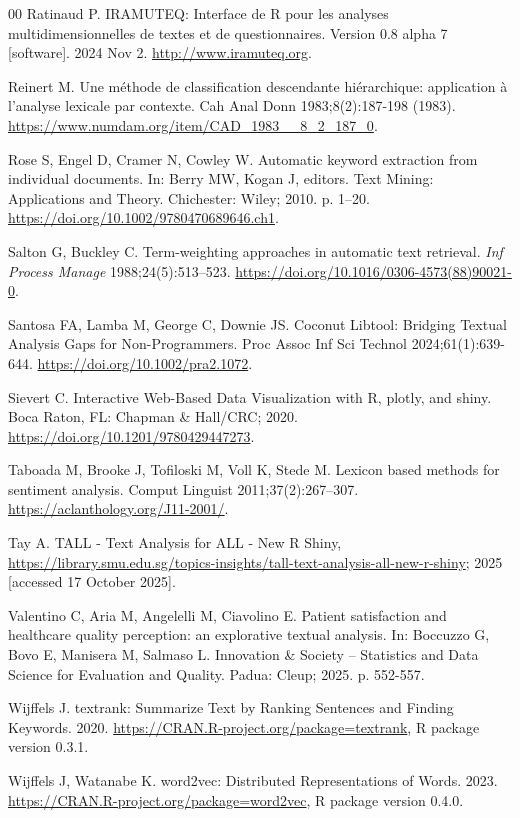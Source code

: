 \documentclass[preprint,12pt,a4paper]{elsarticle}
\begin{document}
\begin{thebibliography}{00}
 Ratinaud P. IRAMUTEQ: Interface de R pour les analyses multidimensionnelles de textes et de questionnaires. Version 0.8 alpha 7 [software]. 2024 Nov 2. \url{http://www.iramuteq.org}.

 Reinert M. Une m{\'e}thode de classification descendante hi{\'e}rarchique: application {\`a} l'analyse lexicale par contexte. Cah Anal Donn 1983;8(2):187-198 (1983). \url{https://www.numdam.org/item/CAD_1983__8_2_187_0}.

 Rose S, Engel D, Cramer N, Cowley W. Automatic keyword extraction from individual documents. In: Berry MW, Kogan J, editors. Text Mining: Applications and Theory. Chichester: Wiley; 2010. p. 1–20. \url{https://doi.org/10.1002/9780470689646.ch1}.

 Salton G, Buckley C. Term-weighting approaches in automatic text retrieval. \textit{Inf Process Manage} 1988;24(5):513–523. \url{https://doi.org/10.1016/0306-4573(88)90021-0}.

 Santosa FA, Lamba M, George C, Downie JS. Coconut Libtool: Bridging Textual Analysis Gaps for Non-Programmers. Proc Assoc Inf Sci Technol 2024;61(1):639-644. \url{https://doi.org/10.1002/pra2.1072}.

 Sievert C. Interactive Web-Based Data Visualization with R, plotly, and shiny. Boca Raton, FL: Chapman \& Hall/CRC; 2020. \url{https://doi.org/10.1201/9780429447273}.

 Taboada M, Brooke J, Tofiloski M, Voll K, Stede M. Lexicon based methods for sentiment analysis. Comput Linguist 2011;37(2):267–307. \url{https://aclanthology.org/J11-2001/}.

 Tay A. TALL - Text Analysis for ALL - New R Shiny, \url{https://library.smu.edu.sg/topics-insights/tall-text-analysis-all-new-r-shiny}; 2025 [accessed 17 October 2025].

 Valentino C, Aria M, Angelelli M, Ciavolino E. Patient satisfaction and healthcare quality perception: an explorative textual analysis. In: Boccuzzo G, Bovo E, Manisera M, Salmaso L. Innovation \& Society -- Statistics and Data Science for Evaluation and Quality. Padua: Cleup; 2025. p. 552-557.

 Wijffels J. textrank: Summarize Text by Ranking Sentences and Finding Keywords. 2020. \url{https://CRAN.R-project.org/package=textrank}, R package version
0.3.1.

 Wijffels J, Watanabe K. word2vec: Distributed Representations of Words. 2023. \url{https://CRAN.R-project.org/package=word2vec}, R package version 0.4.0.


\end{thebibliography}
\end{document}
